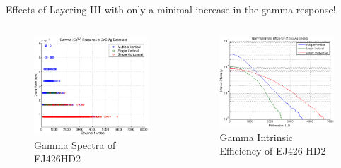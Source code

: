 \begin{frame}{Effects of Layering III}
with only a minimal increase in the gamma response!
\begin{columns}[onlytextwidth]
\begin{column}{0.45\textwidth}
	\tiny
	\begin{figure}
		\centering
		\includegraphics[width=\textwidth]{images/EJ426HD_Multi_GammaComparison.eps}
		\caption{Gamma Spectra of EJ426HD2}
	\end{figure}
\end{column}
\begin{column}{0.45\textwidth}
	\tiny
	\begin{figure}
		\centering
		\includegraphics[width=\textwidth]{images/EJ426HD_Multi_GammaIntEff.eps}
		\caption{Gamma Intrinsic Efficiency of EJ426-HD2}
\end{figure}
\end{column}
\end{columns}
\end{frame}

